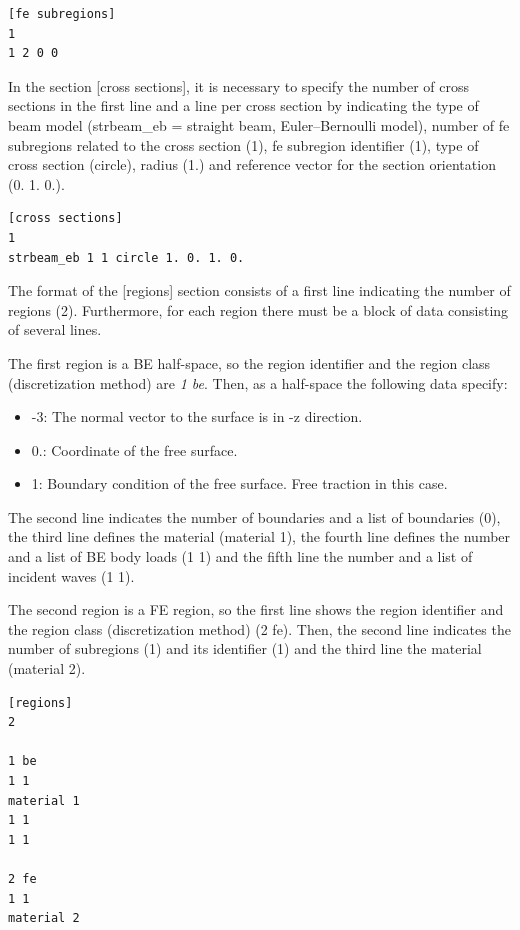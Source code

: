 \documentclass[a4]{article}
\begin{document}
\begin{Verbatim}
[fe subregions]
1
1 2 0 0
\end{Verbatim}

In the section [cross sections], it is necessary to specify the number of cross sections in the first line and a line per cross section by indicating the type of beam model (strbeam\_eb = straight beam, Euler–Bernoulli model), number of fe subregions related to the cross section (1), fe subregion identifier (1), type of cross section (circle), radius (1.) and reference vector for the section orientation (0. 1. 0.).

\begin{Verbatim}
[cross sections]
1
strbeam_eb 1 1 circle 1. 0. 1. 0.
\end{Verbatim}

The format of the [regions] section consists of a first line indicating the number of regions (2). Furthermore, for each region there must be a block of data consisting of several lines. 

The first region is a BE half-space, so the region identifier and the region class (discretization method) are \emph{1 be}. Then, as a half-space the following data specify:

\begin{itemize}
	\item -3: The normal vector to the surface is in -z direction.
	\item 0.: Coordinate of the free surface.
	\item 1: Boundary condition of the free surface. Free traction in this case. 
\end{itemize}

The second line indicates the number of boundaries and a list of boundaries (0), the third line defines the material (material 1), the fourth line defines the number and a list of BE body loads (1 1) and the fifth line the number and a list of incident waves (1 1).

The second region is a FE region, so the first line shows the region identifier and the region class (discretization method) (2 fe). Then, the second line indicates the number of subregions (1) and its identifier (1) and the third line the material (material 2). 

\begin{Verbatim}	
[regions]
2

1 be
1 1
material 1
1 1
1 1

2 fe
1 1
material 2
\end{Verbatim}
\end{document}
